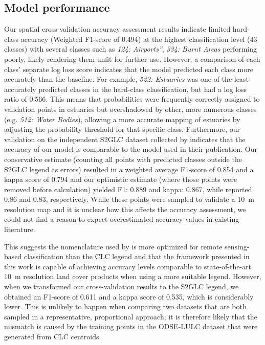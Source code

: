 \subsection*{Model performance}

Our spatial cross-validation accuracy assessment results indicate limited hard-class accuracy (Weighted F1-score of 0.494) at the highest classification level (43 classes) with several classes such as \emph{124: Airports''}, \emph{334: Burnt Areas} performing poorly, likely rendering them unfit for further use. However, a comparison of each class' separate log loss score indicates that the model predicted each class more accurately than the baseline. For example, \emph{522: Estuaries} was one of the least accurately predicted classes in the hard-class classification, but had a log loss ratio of 0.566. This means that probabilities were frequently correctly assigned to validation points in estuaries but overshadowed by other, more numerous classes (e.g. \emph{512: Water Bodies}), allowing a more accurate mapping of estuaries by adjusting the probability threshold for that specific class. Furthermore, our validation on the independent S2GLC dataset collected by \citet{malinowski2020} indicates that the accuracy of our model is comparable to the model used in their publication. Our conservative estimate (counting all points with predicted classes outside the S2GLC legend as errors) resulted in a weighted average F1-score of 0.854 and a kappa score of 0.794 and our optimistic estimate (where those points were removed before calculation) yielded F1: 0.889 and kappa: 0.867, while \citet{malinowski2020} reported 0.86 and 0.83, respectively. While these points were sampled to validate a 10\@~m resolution map and it is unclear how this affects the accuracy assessment, we could not find a reason to expect overestimated accuracy values in existing literature.
    
This suggests the nomenclature used by \citet{malinowski2020} is more optimized for remote sensing-based classification than the CLC legend and that the framework presented in this work is capable of achieving accuracy levels comparable to state-of-the-art 10~m resolution land cover products when using a more suitable legend. However, when we transformed our cross-validation results to the S2GLC legend, we obtained an F1-score of 0.611 and a kappa score of 0.535, which is considerably lower. This is unlikely to happen when comparing two datasets that are both sampled in a representative, proportional approach; it is therefore likely that the mismatch is caused by the training points in the  ODSE-LULC dataset that were generated from CLC centroids. 
    
